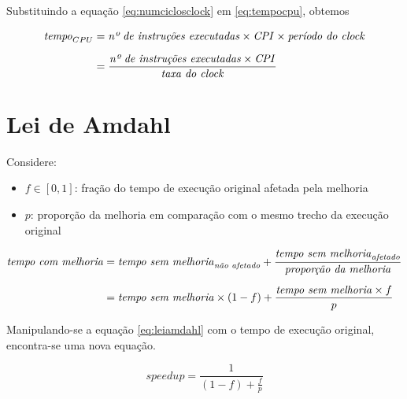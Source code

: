 \documentclass[12pt]{article}
\newcommand{\Text}[1]{\textrm{\textit{#1}}}
\begin{document}
Substituindo a equação \ref{eq:numciclosclock} em \ref{eq:tempocpu}, obtemos

\begin{align} \label{eq:desempenho}
  \Text{tempo}_{CPU}
  &= \Text{nº de instruções executadas} \times \Text{CPI} \times \Text{período do clock} \\[\medskipamount]
  &= \frac{\Text{nº de instruções executadas} \times \Text{CPI}}{\Text{taxa do clock}} \nonumber
\end{align}


\section{Lei de Amdahl}


Considere:
\begin{itemize}
  \item \(f \in [0, 1]\): fração do tempo de execução original afetada pela melhoria
  \item \(p\): proporção da melhoria em comparação com o mesmo trecho da execução original
\end{itemize}

\begin{align} \label{eq:leiamdahl}
  \Text{tempo com melhoria}
  &= \Text{tempo sem melhoria}_\Text{não afetado}
  + \frac{\Text{tempo sem melhoria}_\Text{afetado}}{\Text{proporção da melhoria}} \\[\medskipamount]\nonumber
  &= \Text{tempo sem melhoria} \times (1 - f)
  + \frac{\Text{tempo sem melhoria} \times f}{p}
\end{align}

Manipulando-se a equação \ref{eq:leiamdahl} com o tempo de execução original, encontra-se uma nova equação.

\begin{equation} \label{eq:speedupamdahl}
  speedup = \frac{1}{(1 - f) + \frac{f}{p}}
\end{equation}
\end{document}
